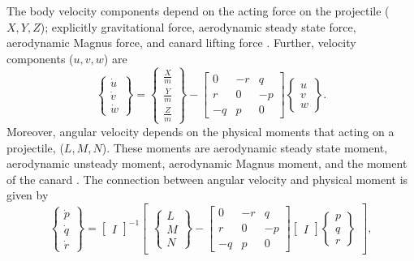 \documentclass[letterpaper, 10 pt, conference]{ieeeconf}  %
\begin{document}
The body velocity components depend on the acting force on the projectile ($X, Y, Z$); explicitly gravitational force, aerodynamic steady state force, aerodynamic Magnus force, and canard lifting force \cite{costello2001extended}. Further, velocity components ($u, v, w$) are 
\begin{equation}
\begin{Bmatrix}
\dot{u}\\ \dot{v} \\ \dot{w}
\end{Bmatrix}
=
\begin{Bmatrix}
\frac{X}{m}\\ \frac{Y}{m} \\ \frac{Z}{m}
\end{Bmatrix}
-
\begin{bmatrix}
0& -r & q \\ r & 0 & -p \\ -q & p & 0
\end{bmatrix}
\begin{Bmatrix}
u \\ v \\ w
\end{Bmatrix}.
\label{eqn:n3}
\end{equation}
Moreover, angular velocity depends on the physical moments that acting on a projectile, ($L, M, N$). These moments are aerodynamic steady state moment, aerodynamic unsteady moment, aerodynamic Magnus moment, and the moment of the canard \cite{costello2001extended}. The connection between angular velocity and physical moment is given by 
\begin{equation}
\begin{Bmatrix}
\dot{p}\\ \dot{q} \\ \dot{r}
\end{Bmatrix}
=
\begin{bmatrix}
I
\end{bmatrix}^{-1}
\begin{bmatrix}

\begin{Bmatrix}
L\\ M \\ N
\end{Bmatrix}
-
\begin{bmatrix}
0& -r & q \\ r & 0 & -p \\ -q & p & 0
\end{bmatrix}
\begin{bmatrix}
I
\end{bmatrix}
\begin{Bmatrix}
p\\q\\r
\end{Bmatrix}
\end{bmatrix}
\label{eqn:n4},
\end{equation}
\end{document}
